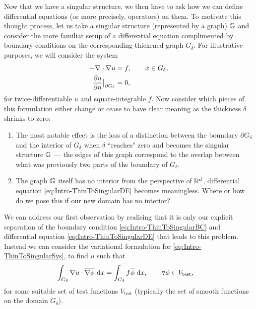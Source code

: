 Now that we have a singular structure, we then have to ask how we can define differential equations (or more precisely, operators) on them.
To motivate this thought process, let us take a singular structure (represented by a graph) $\mathbb{G}$ and consider the more familiar setup of a differential equation complimented by boundary conditions on the corresponding thickened graph $G_{\delta}$.
For illustrative purposes, we will consider the system
\begin{subequations} \label{eq:Intro-ThinToSingularSys}
	\begin{align}
		-\nabla\cdot\nabla u &= f, \qquad x\in G_{\delta}, \label{eq:Intro-ThinToSingularDE} \\
		\dfrac{\partial u}{\partial n}\big\vert_{\partial G_{\delta}} &= 0, \label{eq:Intro-ThinToSingularBC}
	\end{align}
\end{subequations}
for twice-differentiable $u$ and square-integrable $f$.
Now consider which pieces of this formulation either change or cease to have clear meaning as the thickness $\delta$ shrinks to zero:
\begin{enumerate}
	\item The most notable effect is the loss of a distinction between the boundary $\partial G_{\delta}$ and the interior of $G_{\delta}$ when $\delta$ ``reaches" zero and becomes the singular structure $\mathbb{G}$ --- the edges of this graph correspond to the overlap between what was previously two parts of the boundary of $G_{\delta}$.
	\item The graph $\mathbb{G}$ itself has no interior from the perspective of $\mathbb{R}^d$, differential equation \eqref{eq:Intro-ThinToSingularDE} becomes meaningless.
	Where or how do we pose this if our new domain has no interior?
\end{enumerate}
We can address our first observation by realising that it is only our explicit separation of the boundary condition \eqref{eq:Intro-ThinToSingularBC} and differential equation \eqref{eq:Intro-ThinToSingularDE} that leads to this problem.
Instead we can consider the variational formulation for \eqref{eq:Intro-ThinToSingularSys}, to find $u$ such that
\begin{align} \label{eq:Intro-ThinToSingularVar}
	\int_{G_{\delta}} \nabla u\cdot \overline{\nabla\phi}  \ \mathrm{d}x 
	&= \int_{G_{\delta}} f\overline{\phi}  \ \mathrm{d}x, \qquad\forall\phi\in V_{\mathrm{test}},
\end{align}
for some suitable set of test functions $V_{\mathrm{test}}$ (typically the set of smooth functions on the domain $G_{\delta}$).
